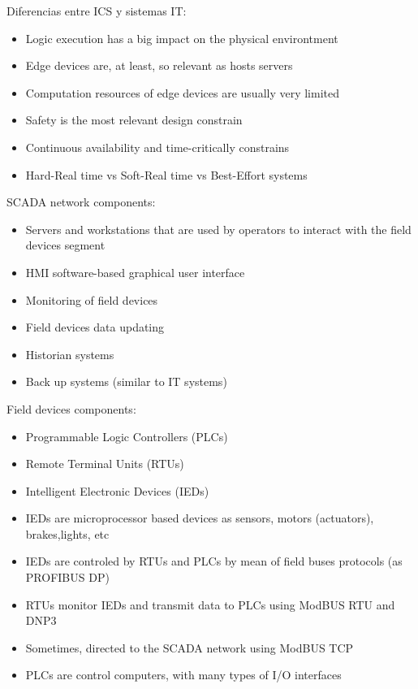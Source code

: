 Diferencias entre ICS y sistemas IT:
\begin{itemize}
	\item Logic execution has a big impact on the physical environtment
	\item Edge devices are, at least, so relevant as hosts servers
	\item Computation resources of edge devices are usually very limited
	\item Safety is the most relevant design constrain
	\item Continuous availability and time-critically constrains
	\item Hard-Real time vs Soft-Real time vs Best-Effort systems
\end{itemize}

SCADA network components:
\begin{itemize}
	\item Servers and workstations that are used by operators to
interact with the field devices segment
	\item HMI software-based graphical user interface
	\item Monitoring of field devices
	\item Field devices data updating
	\item Historian systems
	\item Back up systems (similar to IT systems)
\end{itemize}

Field devices components:
\begin{itemize}
	\item Programmable Logic Controllers (PLCs)
	\item Remote Terminal Units (RTUs)
	\item Intelligent Electronic Devices (IEDs)
	\item IEDs are microprocessor based devices as sensors, motors (actuators),
brakes,lights, etc
	\item IEDs are controled by RTUs and PLCs by mean of field buses
protocols (as PROFIBUS DP)
	\item RTUs monitor IEDs and transmit data to PLCs using ModBUS RTU and
DNP3
	\item Sometimes, directed to the SCADA network using ModBUS TCP
	\item PLCs are control computers, with many types of I/O interfaces
\end{itemize}


